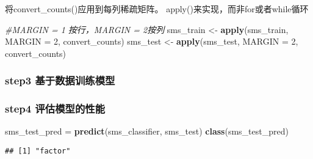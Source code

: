 \documentclass[]{article}
\newenvironment{Shaded}{\begin{snugshade}}{\end{snugshade}}
\newcommand{\KeywordTok}[1]{\textcolor[rgb]{0.13,0.29,0.53}{\textbf{#1}}}
\newcommand{\DataTypeTok}[1]{\textcolor[rgb]{0.13,0.29,0.53}{#1}}
\newcommand{\DecValTok}[1]{\textcolor[rgb]{0.00,0.00,0.81}{#1}}
\newcommand{\StringTok}[1]{\textcolor[rgb]{0.31,0.60,0.02}{#1}}
\newcommand{\CommentTok}[1]{\textcolor[rgb]{0.56,0.35,0.01}{\textit{#1}}}
\newcommand{\OperatorTok}[1]{\textcolor[rgb]{0.81,0.36,0.00}{\textbf{#1}}}
\newcommand{\NormalTok}[1]{#1}
\begin{document}
将convert\_counts()应用到每列稀疏矩阵。
apply()来实现，而非for或者while循环

\begin{Shaded}
\begin{Highlighting}[]
\CommentTok{#MARGIN = 1 按行，MARGIN = 2按列}
\NormalTok{sms_train <-}\StringTok{ }\KeywordTok{apply}\NormalTok{(sms_train, }\DataTypeTok{MARGIN =} \DecValTok{2}\NormalTok{, convert_counts)}
\NormalTok{sms_test <-}\StringTok{ }\KeywordTok{apply}\NormalTok{(sms_test, }\DataTypeTok{MARGIN =} \DecValTok{2}\NormalTok{, convert_counts)}
\end{Highlighting}
\end{Shaded}

\subsubsection{step3 基于数据训练模型}\label{step3-}

\begin{Shaded}
\end{Shaded}

\subsubsection{step4 评估模型的性能}\label{step4-}

\begin{Shaded}
\begin{Highlighting}[]
\NormalTok{sms_test_pred =}\StringTok{ }\KeywordTok{predict}\NormalTok{(sms_classifier, sms_test)}
\KeywordTok{class}\NormalTok{(sms_test_pred)}
\end{Highlighting}
\end{Shaded}

\begin{verbatim}
## [1] "factor"
\end{verbatim}

\begin{Shaded}
\end{Shaded}
\end{document}
